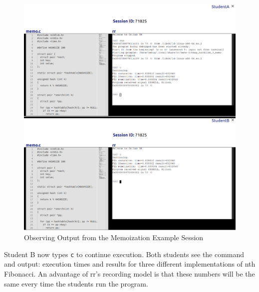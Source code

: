 \documentclass[12pt]{article}
\begin{document}
\begin{figure}[h!]

  \includegraphics[width=\textwidth]{session3i}
  \centering
  \caption{Observing Output from the Memoization Example Session}
  \label{session3i}
\end{figure}

Student B now types \lstinline{c} to continue execution.  Both
students see the command and output: execution times and results for
three different implementations of nth Fibonacci.  An advantage of
rr's recording model is that these numbers will be the same every time
the students run the program.\pagebreak
\end{document}
